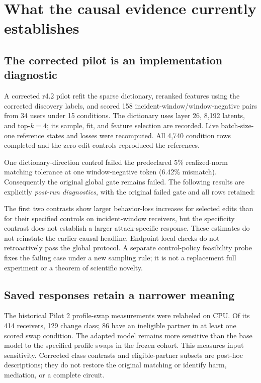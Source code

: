 \section{What the causal evidence currently establishes}
\label{sec:causal-status}
\subsection{The corrected pilot is an implementation diagnostic}
A corrected r4.2 pilot refit the sparse dictionary, reranked features using the
corrected discovery labels, and scored 158 incident-window/window-negative
pairs from 34 users under 15 conditions. The dictionary uses layer 26, 8,192
latents, and top-$k=4$; its sample, fit, and feature selection are recorded.
Live batch-size-one reference states and losses were recomputed. All 4,740
condition rows completed and the zero-edit controls reproduced the references.

One dictionary-direction control failed the predeclared 5\% realized-norm
matching tolerance at one window-negative token (6.42\% mismatch). Consequently
the original global gate remains failed. The following results are explicitly
\emph{post-run diagnostics}, with the original failed gate and all rows retained:
\begin{center}\end{center}
The first two contrasts show larger behavior-loss increases for selected edits
than for their specified controls on incident-window receivers, but the
specificity contrast does not establish a
larger attack-specific response. These estimates do not reinstate the earlier
causal headline. Endpoint-local checks do not retroactively pass the global
protocol. A separate control-policy feasibility probe fixes the failing case
under a new sampling rule; it is not a replacement full experiment or a theorem
of scientific novelty.

\subsection{Saved responses retain a narrower meaning}
The historical Pilot 2 profile-swap measurements were relabeled on CPU. Of its
414 receivers, 129 change class; 86 have an ineligible partner in at least one
scored swap condition. The adapted model remains more sensitive than the base
model to the specified profile swaps in the frozen cohort. This measures input
sensitivity. Corrected class contrasts and eligible-partner subsets are post-hoc
descriptions; they do not restore the original matching or identify harm,
mediation, or a complete circuit.

